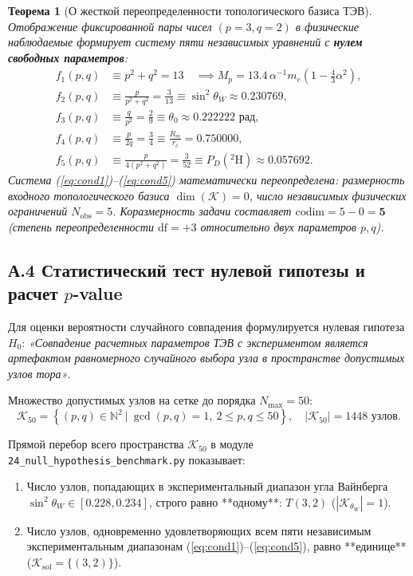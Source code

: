 \documentclass[11pt,a4paper]{article}
\newtheorem{theorem}{Теорема}[section]
\theoremstyle{definition}
\theoremstyle{remark}
\begin{document}
\begin{theorem}[О жесткой переопределенности топологического базиса ТЭВ]
Отображение фиксированной пары чисел $(p=3, q=2)$ в физические наблюдаемые формирует систему пяти независимых уравнений с \textbf{нулем свободных параметров}:
\begin{align}
    f_1(p, q) &\equiv p^2 + q^2 = 13 \quad \implies M_p = 13.4 \, \alpha^{-1} m_e \left(1 - \frac{4}{3}\alpha^2\right), \label{eq:cond1}\\
    f_2(p, q) &\equiv \frac{p}{p^2 + q^2} = \frac{3}{13} \equiv \sin^2\theta_W \approx 0.230769, \label{eq:cond2}\\
    f_3(p, q) &\equiv \frac{q}{p^2} = \frac{2}{9} \equiv \theta_0 \approx 0.222222\text{ рад}, \label{eq:cond3}\\
    f_4(p, q) &\equiv \frac{p}{2q} = \frac{3}{4} \equiv \frac{R_m}{r_c} = 0.750000, \label{eq:cond4}\\
    f_5(p, q) &\equiv \frac{p}{4(p^2+q^2)} = \frac{3}{52} \equiv P_D(^2\mathrm{H}) \approx 0.057692. \label{eq:cond5}
\end{align}
Система (\ref{eq:cond1})--(\ref{eq:cond5}) математически переопределена: размерность входного топологического базиса $\dim(\mathcal{K}) = 0$, число независимых физических ограничений $N_{\mathrm{obs}} = 5$. Коразмерность задачи составляет $\mathrm{codim} = 5 - 0 = \mathbf{5}$ (степень переопределенности $\mathrm{df} = +3$ относительно двух параметров $p, q$).
\end{theorem}

\subsection*{А.4 Статистический тест нулевой гипотезы и расчет $p$-value}
Для оценки вероятности случайного совпадения формулируется нулевая гипотеза $H_0$: \textit{«Совпадение расчетных параметров ТЭВ с экспериментом является артефактом равномерного случайного выбора узла в пространстве допустимых узлов тора»}.

Множество допустимых узлов на сетке до порядка $N_{\max} = 50$:
\begin{equation}
    \mathcal{K}_{50} = \left\{ (p, q) \in \mathbb{N}^2 \ \big|\ \gcd(p, q) = 1, \ 2 \le p, q \le 50 \right\}, \quad |\mathcal{K}_{50}| = 1448 \text{ узлов}.
\end{equation}

Прямой перебор всего пространства $\mathcal{K}_{50}$ в модуле \texttt{24\_null\_hypothesis\_benchmark.py} показывает:
\begin{enumerate}
    \item Число узлов, попадающих в экспериментальный диапазон угла Вайнберга $\sin^2\theta_W \in [0.228, 0.234]$, строго равно **одному**: $T(3,2)$ ($|\mathcal{K}_{\theta_W}| = 1$).
    \item Число узлов, одновременно удовлетворяющих всем пяти независимым экспериментальным диапазонам (\ref{eq:cond1})--(\ref{eq:cond5}), равно **единице** ($\mathcal{K}_{\mathrm{sol}} = \{(3, 2)\}$).
\end{enumerate}
\end{document}
